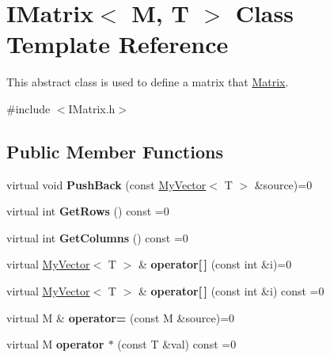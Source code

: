 \hypertarget{class_i_matrix}{}\section{I\+Matrix$<$ M, T $>$ Class Template Reference}
\label{class_i_matrix}


This abstract class is used to define a matrix that \mbox{\hyperlink{class_matrix}{Matrix}}.  




{\ttfamily \#include $<$I\+Matrix.\+h$>$}

\subsection*{Public Member Functions}
\begin{DoxyCompactItemize}
\item 
\mbox{\label{class_i_matrix_aa5de147c7aa5b74b0f2177ed1a8158de}} 
virtual void {\bfseries Push\+Back} (const \mbox{\hyperlink{class_my_vector}{My\+Vector}}$<$ T $>$ \&source)=0
\item 
\mbox{\label{class_i_matrix_a58632b018f4023768db7963e22f468da}} 
virtual int {\bfseries Get\+Rows} () const =0
\item 
\mbox{\label{class_i_matrix_a3b84da3898ef38bdf281c13f218fc278}} 
virtual int {\bfseries Get\+Columns} () const =0
\item 
\mbox{\label{class_i_matrix_a3cfb2490e2849c6c19c1979066a64818}} 
virtual \mbox{\hyperlink{class_my_vector}{My\+Vector}}$<$ T $>$ \& {\bfseries operator\mbox{[}$\,$\mbox{]}} (const int \&i)=0
\item 
\mbox{\label{class_i_matrix_a1ed62ee6700728045083c7f0df3e3e62}} 
virtual \mbox{\hyperlink{class_my_vector}{My\+Vector}}$<$ T $>$ \& {\bfseries operator\mbox{[}$\,$\mbox{]}} (const int \&i) const =0
\item 
\mbox{\label{class_i_matrix_a9eeb68de7e1d37d1aab439c78fea9be3}} 
virtual M \& {\bfseries operator=} (const M \&source)=0
\item 
\mbox{\label{class_i_matrix_a10121e038635bdf33552c6a1fb288398}} 
virtual M {\bfseries operator $\ast$} (const T \&val) const =0
\end{DoxyCompactItemize}


